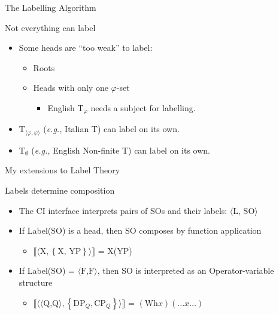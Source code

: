 \documentclass[Proposal]{subfiles}
\begin{document}
\begin{frame}
  {The Labelling Algorithm}
  {\textcite{chomsky2013problems,chomsky2015problems}}
  \begin{block}
    {Not everything can label}
    \begin{itemize}[<+->]
      \item Some heads are ``too weak'' to label:
	\begin{itemize}
	  \item Roots
	  \item Heads with only one $\varphi$-set
	    \begin{itemize}
	      \item English T$_\varphi$ needs a subject for labelling.
	    \end{itemize}
	\end{itemize}
    \end{itemize}
  \end{block}
  \begin{itemize}[<+->]
    \item T$_{\langle \varphi,\varphi\rangle}$ (\textit{e.g.,} Italian T) can label on its own.
    \item T$_\emptyset$ (\textit{e.g.,} English Non-finite T) can label on its own.
  \end{itemize}
\end{frame}
\begin{frame}
  {My extensions to Label Theory}
  \begin{block}
    {Labels determine composition}
    \begin{itemize}
      \item The CI interface interprets pairs of SOs and their labels: $\langle \text{L, SO} \rangle$
      \item<2-> If Label(SO) is a head, then SO composes by function application
	\begin{itemize}
	  \item<3-> $\llbracket\langle \text{X}, \left\{ \text{X, YP} \right\}\rangle\rrbracket$ = X(YP)
	\end{itemize}
      \item<4-> If Label(SO) = $\langle\text{F,F}\rangle$, then SO is interpreted as an Operator-variable structure
	\begin{itemize}
	  \item<5-> $\llbracket\langle \langle\text{Q,Q} \rangle, \left\{ \text{DP}_Q, \text{CP}_Q \right\}\rangle\rrbracket$ = $(\text{Wh}x)(\dots x \dots)$
	\end{itemize}
    \end{itemize}
  \end{block}
\end{frame}
\end{document}
